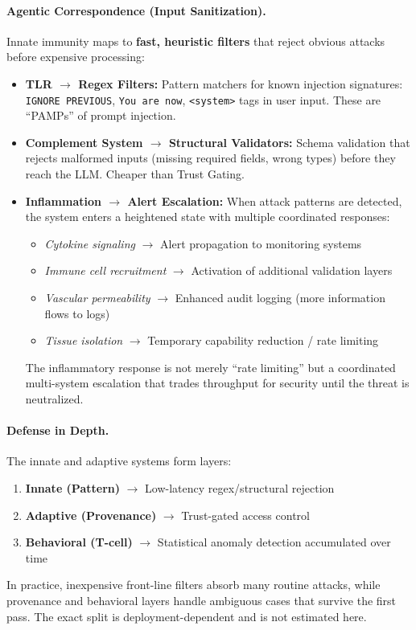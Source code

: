 \paragraph{Agentic Correspondence (Input Sanitization).}
Innate immunity maps to \textbf{fast, heuristic filters} that reject obvious attacks before expensive processing:
\begin{itemize}[leftmargin=*]
\item \textbf{TLR $\to$ Regex Filters:} Pattern matchers for known injection signatures: \texttt{IGNORE PREVIOUS},
\texttt{You are now}, \texttt{<system>} tags in user input. These are ``PAMPs'' of prompt injection.
\item \textbf{Complement System $\to$ Structural Validators:} Schema validation that rejects malformed inputs
(missing required fields, wrong types) before they reach the LLM. Cheaper than Trust Gating.
\item \textbf{Inflammation $\to$ Alert Escalation:} When attack patterns are detected, the system
enters a heightened state with multiple coordinated responses:
\begin{itemize}
\item \textit{Cytokine signaling} $\to$ Alert propagation to monitoring systems
\item \textit{Immune cell recruitment} $\to$ Activation of additional validation layers
\item \textit{Vascular permeability} $\to$ Enhanced audit logging (more information flows to logs)
\item \textit{Tissue isolation} $\to$ Temporary capability reduction / rate limiting
\end{itemize}
The inflammatory response is not merely ``rate limiting'' but a coordinated multi-system escalation
that trades throughput for security until the threat is neutralized.
\end{itemize}

\paragraph{Defense in Depth.}
The innate and adaptive systems form layers:
\begin{enumerate}[leftmargin=*]
\item \textbf{Innate (Pattern)} $\to$ Low-latency regex/structural rejection
\item \textbf{Adaptive (Provenance)} $\to$ Trust-gated access control
\item \textbf{Behavioral (T-cell)} $\to$ Statistical anomaly detection accumulated over time
\end{enumerate}
In practice, inexpensive front-line filters absorb many routine attacks, while provenance and behavioral
layers handle ambiguous cases that survive the first pass. The exact split is deployment-dependent and is
not estimated here.

